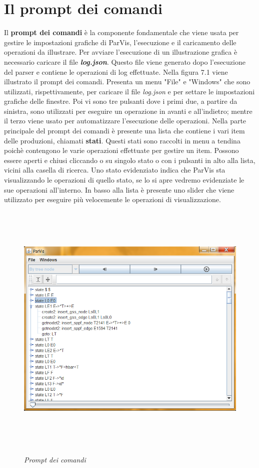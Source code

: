 \section{Il prompt dei comandi}
Il \textbf{prompt dei comandi} è la componente fondamentale che viene usata per gestire le impostazioni grafiche di ParVis, l'esecuzione e il caricamento delle operazioni da illustrare. Per avviare l'esecuzione di un illustrazione grafica è necessario caricare il file \textbf{\textit{log.json}}. Questo file viene generato dopo l'esecuzione del parser e contiene le operazioni di log effettuate. Nella figura 7.1 viene illustrato il prompt dei comandi. Presenta un menu "File" e "Windows" che sono utilizzati, rispettivamente, per caricare il file \textit{log.json} e per settare le impostazioni grafiche delle finestre. Poi vi sono tre pulsanti dove i primi due, a partire da sinistra, sono utilizzati per eseguire un operazione in avanti e all'indietro; mentre il terzo viene usato per automatizzare l'esecuzione delle operazioni. Nella parte principale del prompt dei comandi è presente una lista che contiene i vari item delle produzioni, chiamati \textbf{stati}. Questi stati sono raccolti in menu a tendina poichè contengono le varie operazioni effettuate per gestire un item. Possono essere aperti e chiusi cliccando o su singolo stato o con i pulsanti in alto alla lista, vicini alla casella di ricerca. Uno stato evidenziato indica che ParVis sta visualizzando le operazioni di quello stato, se lo si apre vedremo evidenziate le sue operazioni all'interno. In basso alla lista è presente uno slider che viene utilizzato per eseguire più velocemente le operazioni di visualizzazione.\par
\begin{figure}[hbpb]\label{prompt}
	{\includegraphics[height=350pt,width=420pt,scale=0.1]{files/ParVisCommand.png}}
	\caption{\textit{Prompt dei comandi}}
\end{figure}
